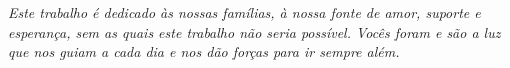\begin{dedicatoria}
   \vspace*{\fill}
   \textit{Este trabalho é dedicado às nossas famílias, à nossa fonte de amor, suporte e esperança, sem as quais este trabalho não seria possível. Vocês foram e são a luz que nos guiam a cada dia e nos dão forças para ir sempre além.}
   \vspace*{\fill}
\end{dedicatoria}